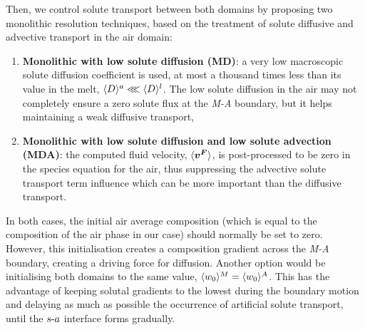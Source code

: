 Then, we control solute transport between both domains by proposing two
monolithic resolution techniques, based on the treatment of solute diffusive 
and advective transport in the air domain: 

\begin{enumerate}

	\item \textbf{Monolithic with low solute diffusion (MD)}: 
	a very low macroscopic solute diffusion coefficient is used, 
	at most a thousand times less than its value in the melt, $\langle D \rangle^a \lll \langle D \rangle^l$.
	The low solute diffusion in the air may not completely ensure a zero solute flux at 
	the \emph{M-A} boundary, but it helps maintaining a weak diffusive transport,

	\item \textbf{Monolithic with low solute diffusion and low solute advection (MDA)}: 
  the computed fluid velocity, $\langle \boldsymbol{v^F} \rangle$, is post-processed to be zero 
	in the species equation for the air, thus suppressing the advective solute transport term influence
	which can be more important than the diffusive transport.
	
\end{enumerate}

In both cases, the initial air average composition (which is equal to the composition of the air phase in our case) 
should normally be set to zero. However, this initialisation
creates a composition gradient across the \emph{M-A} boundary, creating a driving force for diffusion. 
Another option would be initialising both domains to the same value, $\langle {w}_0 \rangle^M=\langle {w}_0 \rangle^A$. 
This has the advantage of keeping solutal gradients to the lowest during the boundary motion 
and delaying as much as possible the occurrence of artificial solute transport, until the $s\text{-}a$ 
interface forms gradually.



